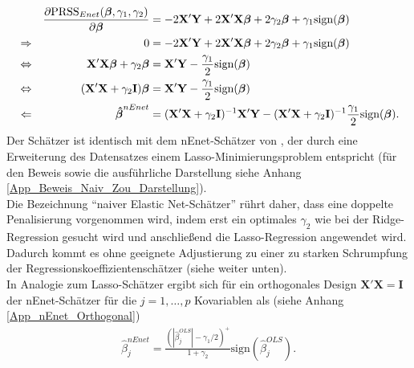 \documentclass[12pt, a4paper]{report}\usepackage[]{graphicx}\usepackage[]{color}
\begin{document}
\begin{align}\label{Eq_Naiv_Enet_Eigene}
&&\frac{\partial \textnormal{PRSS}_{Enet}(\boldsymbol{\beta}, \gamma_1, \gamma_2)}{\partial \boldsymbol{\beta}}&=-2\mathbf{X}'\mathbf{Y} + 2\mathbf{X}'\mathbf{X}\boldsymbol{\beta}+2\gamma_2 \mathbf{\boldsymbol{\beta}} + \gamma_1 \textnormal{sign}(\boldsymbol{\beta}) \notag \\
&\Rightarrow & 0 &=-2\mathbf{X}'\mathbf{Y} + 2\mathbf{X}'\mathbf{X}\boldsymbol{\beta}+2\gamma_2 \mathbf{\boldsymbol{\beta}} + \gamma_1 \textnormal{sign}(\boldsymbol{\beta}) \notag \\
&\Leftrightarrow & \mathbf{X}'\mathbf{X}\boldsymbol{\beta}+\gamma_2 \mathbf{\boldsymbol{\beta}} &=\mathbf{X}'\mathbf{Y} - \frac{\gamma_1}{2} \textnormal{sign}(\boldsymbol{\beta}) \notag \\
&\Leftrightarrow & (\mathbf{X}'\mathbf{X}+\gamma_2 \mathbf{I}) \mathbf{\boldsymbol{\beta}} &=\mathbf{X}'\mathbf{Y} - \frac{\gamma_1}{2} \textnormal{sign}(\boldsymbol{\beta}) \notag \\
&\Leftarrow & \boldsymbol{\hat{\beta}}^{nEnet} 
&=(\mathbf{X}'\mathbf{X}+\gamma_2 \mathbf{I})^{-1}\mathbf{X}'\mathbf{Y} - (\mathbf{X}'\mathbf{X}+\gamma_2 \mathbf{I})^{-1} \frac{\gamma_1}{2} \textnormal{sign}(\boldsymbol{\beta}).
\end{align}
Der Schätzer ist identisch mit dem nEnet-Schätzer von , der durch eine Erweiterung des Datensatzes einem Lasso-Minimierungsproblem entspricht (für den Beweis sowie die ausführliche Darstellung siehe Anhang \ref{App_Beweis_Naiv_Zou_Darstellung}).\\ 
Die Bezeichnung "`naiver Elastic Net-Schätzer"' rührt daher, dass eine doppelte Penalisierung vorgenommen wird, indem erst ein optimales $\gamma_2$ wie bei der Ridge-Regression gesucht wird und anschließend die Lasso-Regression angewendet wird. Dadurch kommt es ohne geeignete Adjustierung zu einer zu starken Schrumpfung der Regressionskoeffizientenschätzer (siehe weiter unten).\\
In Analogie zum Lasso-Schätzer ergibt sich für ein orthogonales Design $\mathbf{X}'\mathbf{X}=\mathbf{I}$ der nEnet-Schätzer für die $j=1,\dots, p$ Kovariablen als (siehe Anhang \ref{App_nEnet_Orthogonal})
\begin{align}
\hat{\beta}_j^{nEnet}=\frac{(|\hat{\beta}_j^{OLS}|- \gamma_1 /2)^+}{1+\gamma_2}\text{sign}(\hat{\beta}_j^{OLS}).
\end{align}
\end{document}
